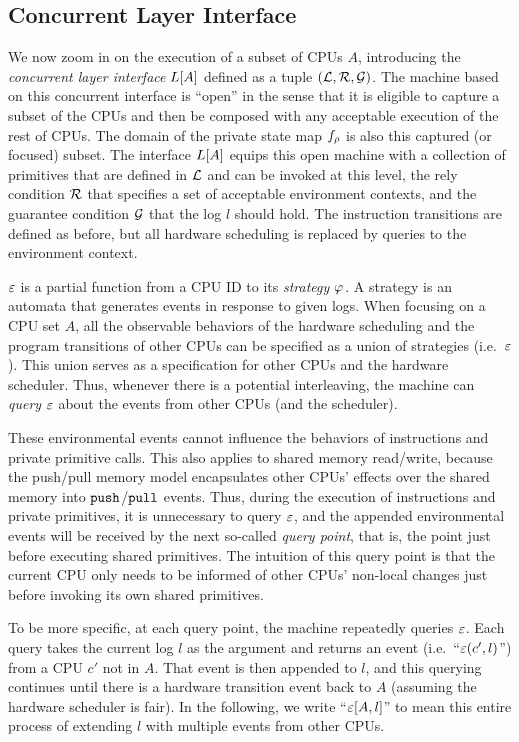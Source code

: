 \subsection{Concurrent Layer Interface}
\label{boot-partial}
We now zoom in on the execution of a subset of CPUs $A$,
introducing the \emph{concurrent layer interface} $L[A]$
defined as a tuple
$(\mathcal{L}, \mathcal{R}, \mathcal{G})$.
The machine based on this concurrent interface is ``open'' in the sense that it is eligible to  capture  a subset of the
CPUs and then be composed with any acceptable execution of the rest of CPUs. 
The domain of the private state map $f_\rho$ is also this captured (or focused) subset.
The interface $L[A]$  equips this open machine with a 
collection of primitives that  are defined in $\mathcal{L} $ and can be invoked  at this level,
the rely condition $\mathcal{R}$  that
specifies a set of acceptable environment 
contexts, and
the guarantee condition $\mathcal{G}$
 that the log $l$ should hold.
The instruction transitions are defined as before,
but all hardware scheduling is replaced by queries to
the environment context.

 $\oracle$
is a partial function from a CPU ID to its \emph{strategy} $\varphi_{}$. A strategy is an automata
that generates events in response to given logs. 
When focusing on a CPU set $A$, all the observable behaviors of the hardware scheduling
and the program transitions of other CPUs
can be specified as a union of strategies (i.e.\, $\oracle$).
This union serves
as a specification for other CPUs and the hardware scheduler.
Thus,
whenever there is a potential interleaving,
the machine can \emph{query} $\oracle$ about the events from other CPUs (and the  scheduler).

These environmental events cannot influence the behaviors
of  instructions and private primitive calls. This also applies to
shared memory read/write, because the push/pull memory model encapsulates
other CPUs' effects over the shared memory into ${\mathrm{\texttt{push}}}$/${\mathrm{\texttt{pull}}}$ events.
Thus, during the execution of instructions
and private primitives, it is unnecessary to query $\oracle$, and the appended environmental events will be received by the next
so-called \emph{query point}, that is, the point just
before executing shared primitives.
The intuition of this query point is that
the current CPU only needs to be informed of other CPUs' non-local changes
just before invoking its own shared primitives.

To be more specific, at each query point, the machine repeatedly
queries $\oracle$.
Each query takes the current log $l$
as the argument and returns an event (i.e.\, ``$\oracle(c', l)$'') from a CPU $c'$ not in
$A$. That event is then appended to $l$, and this querying continues
until there is a hardware transition event back to $A$ (assuming the hardware scheduler is fair).
In the following, we write
``$\Query{\oracle}{l}{A}$'' to mean this entire process of extending $l$ with
multiple events from other CPUs. 

